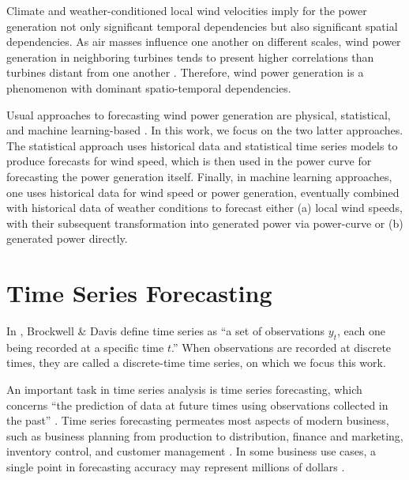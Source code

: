 Climate and weather-conditioned local wind velocities imply for the power generation not only significant temporal dependencies but also significant spatial dependencies.
As air masses influence one another on different scales, wind power generation in neighboring turbines tends to present higher correlations than turbines distant from one another \cite{engeland2017variability}.
Therefore, wind power generation is a phenomenon with dominant spatio-temporal dependencies.

Usual approaches to forecasting wind power generation are physical, statistical, and machine learning-based \cite{jung2014forecasting}.
In this work, we focus on the two latter approaches.
The statistical approach uses historical data and statistical time series models to produce forecasts for wind speed, which is then used in the power curve for forecasting the power generation itself.
Finally, in machine learning approaches, one uses historical data for wind speed or power generation, eventually combined with historical data of weather conditions to forecast either (a) local wind speeds, with their subsequent transformation into generated power via power-curve or (b) generated power directly.

\section{Time Series Forecasting}

In \cite{brockwell1996introduction}, Brockwell \& Davis define time series as ``a set of observations $y_t$, each one being recorded at a specific time $t$.'' When observations are recorded at discrete times, they are called a discrete-time time series, on which we focus this work.

An important task in time series analysis is time series forecasting, which concerns ``the prediction of data at future times using observations collected in the past'' \cite{hyndman2018principles}. Time series forecasting permeates most aspects of modern business, such as business planning from production to distribution,  finance and marketing, inventory control, and customer management \cite{oreshkin2019nbeats}.
In some business use cases, a single point in forecasting accuracy may represent millions of dollars \cite{kahn2003measure, jain2012answers}.

